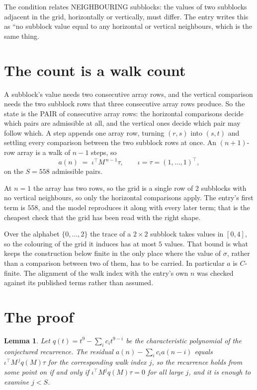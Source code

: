 \documentclass[11pt,a4paper]{article}
\theoremstyle{plain}
\newtheorem{lemma}[theorem]{Lemma}
\theoremstyle{definition}
\begin{document}
The condition relates NEIGHBOURING subblocks: the values of two subblocks adjacent in the grid,
horizontally or vertically, must differ. The entry writes this as ``no subblock value equal to any horizontal or vertical neighbours, which is the same thing.

\section{The count is a walk count}

A subblock's value needs two consecutive array rows, and the vertical
comparison needs the two subblock rows that three consecutive array rows produce. So the state
is the PAIR of consecutive array rows: the horizontal comparisons decide which pairs are
admissible at all, and the vertical ones decide which pair may follow which. A step appends one
array row, turning $(r,s)$ into $(s,t)$ and settling every comparison between the two subblock
rows at once. An $(n+1)$-row array is a walk of $n-1$ steps, so
\[
a(n)\;=\;\iota^{\!\top}M^{\,n-1}\tau,\qquad\iota=\tau=(1,\dots,1)^{\!\top},
\]
on the $S=558$ admissible pairs.

At $n=1$ the array has two rows, so the grid is a single row of $2$
subblocks with no vertical neighbours, so only the horizontal comparisons apply. The
entry's first term is $558$, and the model reproduces it along with every later term; that
is the cheapest check that the grid has been read with the right shape.

Over the alphabet $\{0,\dots,2\}$ the trace of a $2\times2$ subblock takes values in
$[0,4]$, so the colouring of the grid it induces has at most $5$ values.
That bound is what keeps the construction below finite in the only place where the value of
$\sigma$, rather than a comparison between two of them, has to be carried.
In particular $a$ is $C$-finite. The alignment of the walk index with the entry's own $n$ was
checked against its published terms rather than assumed.

\section{The proof}

\begin{lemma}\label{lem:crit}
Let $q(t)=t^{9}-\sum_i c_it^{9-i}$ be the characteristic polynomial of the
conjectured recurrence. The residual $a(n)-\sum_ic_ia(n-i)$ equals
$\iota^{\!\top}M^{\,j}q(M)\tau$ for the corresponding walk index $j$, so the recurrence
holds from some point on if and only if $\iota^{\!\top}M^{j}q(M)\tau=0$ for all large $j$,
and it is enough to examine $j<S$.
\end{lemma}
\end{document}

